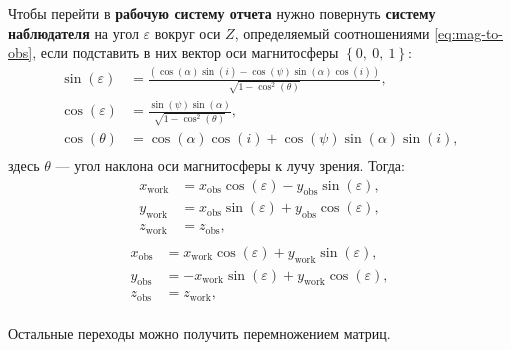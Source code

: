 \documentclass[12pt]{article}
\begin{document}
\begin{itemize}
Чтобы перейти в \textbf{рабочую систему отчета} нужно повернуть \textbf{систему наблюдателя} на угол $\varepsilon$ вокруг оси $Z$, определяемый соотношениями \eqref{eq:mag-to-obs}, если подставить в них вектор оси магнитосферы $\left\lbrace 0,\ 0,\ 1 \right\rbrace$:
%
\begin{equation}\label{eq:work-orientation}
\begin{aligned}
\sin(\varepsilon) &= \frac{(\cos(\alpha)\sin(i) - \cos(\psi)\sin(\alpha)\cos(i))}{\sqrt{1-\cos^2(\theta)}}, \\
\cos(\varepsilon) &= \frac{\sin(\psi)\sin(\alpha)}{\sqrt{1-\cos^2(\theta)}}, \\
\cos(\theta) &= \cos(\alpha)\cos(i) + \cos(\psi)\sin(\alpha)\sin(i), \\
\end{aligned}
\end{equation}
%
здесь $\theta$ --- угол наклона оси магнитосферы к лучу зрения. Тогда:
%
\begin{equation}\label{eq:obs-to-work}
\begin{aligned}
x_\text{work} &= x_\text{obs}\cos(\varepsilon) - y_\text{obs}\sin(\varepsilon), \\
y_\text{work} &= x_\text{obs}\sin(\varepsilon) + y_\text{obs}\cos(\varepsilon) , \\
z_\text{work} &= z_\text{obs}, \\
\end{aligned}
\end{equation}
%
\begin{equation}\label{eq:work-to-obs}
\begin{aligned}
x_\text{obs} &= x_\text{work}\cos(\varepsilon) + y_\text{work}\sin(\varepsilon), \\
y_\text{obs} &= - x_\text{work}\sin(\varepsilon) + y_\text{work}\cos(\varepsilon) , \\
z_\text{obs} &= z_\text{work}, \\
\end{aligned}
\end{equation}

Остальные переходы можно получить перемножением матриц.
\end{itemize}
\end{document}
